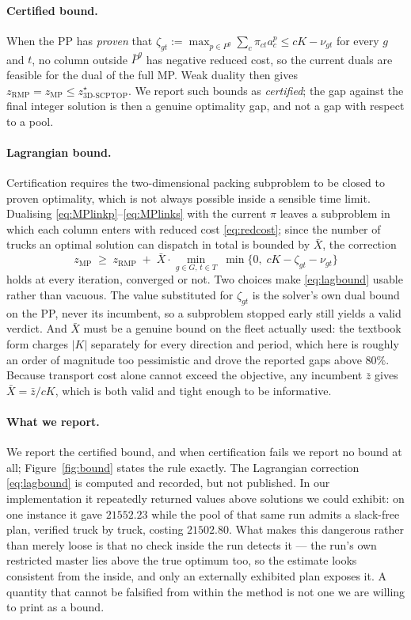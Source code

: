 \paragraph{Certified bound.}
When the PP has \emph{proven} that
$\zeta_{gt}:=\max_{p\in P^{g}}\sum_{c}\pi_{ct}a^{p}_{c}\le cK-\nu_{gt}$
for every $g$ and $t$, no column outside $\bar P^{g}$ has negative
reduced cost, so the current duals are feasible for the dual of the
full MP. Weak duality then gives
$z_{\mathrm{RMP}}=z_{\mathrm{MP}}\le z^{\star}_{\text{3D-SCPTOP}}$.
We report such bounds as \emph{certified}; the gap against the final
integer solution is then a genuine optimality gap, and not a gap with
respect to a pool.

\paragraph{Lagrangian bound.}
Certification requires the two-dimensional packing subproblem to be
closed to proven optimality, which is not always possible inside a
sensible time limit. Dualising
\eqref{eq:MPlinkp}--\eqref{eq:MPlinks} with the current $\pi$ leaves a
subproblem in which each column enters with reduced cost
\eqref{eq:redcost}; since the number of trucks an optimal solution can
dispatch in total is bounded by $\bar X$, the correction
\begin{equation}
z_{\mathrm{MP}}\;\ge\;z_{\mathrm{RMP}}
   \;+\;\bar X\cdot\min_{g\in G,\,t\in T}\;
   \min\bigl\{0,\;cK-\zeta_{gt}-\nu_{gt}\bigr\}
\label{eq:lagbound}
\end{equation}
holds at every iteration, converged or not. Two choices make
\eqref{eq:lagbound} usable rather than vacuous. The value substituted
for $\zeta_{gt}$ is the solver's own dual bound on the PP, never its
incumbent, so a subproblem stopped early still yields a valid
verdict. And $\bar X$ must be a genuine bound on the fleet actually
used: the textbook form charges $|K|$ separately for every direction
and period, which here is roughly an order of magnitude too
pessimistic and drove the reported gaps above $80\%$. Because
transport cost alone cannot exceed the objective, any incumbent
$\bar z$ gives $\bar X=\bar z/cK$, which is both valid and tight
enough to be informative.

\paragraph{What we report.}
We report the certified bound, and when certification fails we report
no bound at all; Figure~\ref{fig:bound} states the rule exactly. The Lagrangian correction \eqref{eq:lagbound} is
computed and recorded, but not published. In our implementation it
repeatedly returned values above solutions we could exhibit: on one
instance it gave $21552.23$ while the pool of that same run admits a
slack-free plan, verified truck by truck, costing $21502.80$. What
makes this dangerous rather than merely loose is that no check inside
the run detects it --- the run's own restricted master lies above the
true optimum too, so the estimate looks consistent from the inside,
and only an externally exhibited plan exposes it. A quantity that
cannot be falsified from within the method is not one we are willing
to print as a bound.

